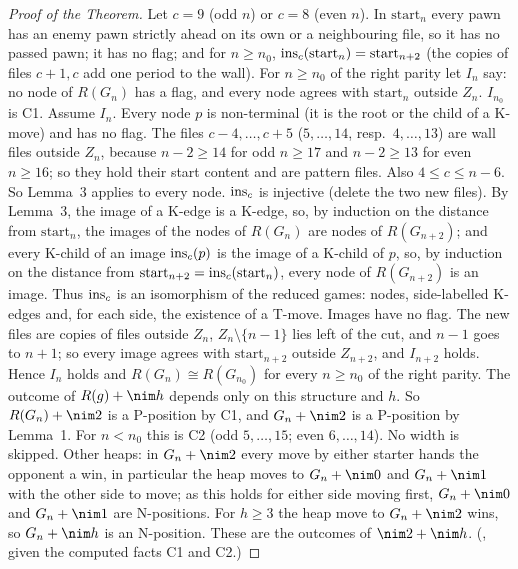 \begin{proof}[Proof of the Theorem]
Let $c=9$ (odd $n$) or $c=8$ (even $n$). In $\mathrm{start}_n$ every pawn has an enemy pawn strictly ahead on its own or a neighbouring
file, so it has no passed pawn; it has no flag; and for $n\ge n_0$, $\operatorname{ins}_c(\mathrm{start}_n)=\mathrm{start}_{n+2}$ (the copies of files
$c+1,c$ add one period to the wall). For $n\ge n_0$ of the right parity let $I_n$ say: no node of $R(G_n)$ has a flag, and every node agrees with
$\mathrm{start}_n$ outside $Z_n$. $I_{n_0}$ is C1.
Assume $I_n$. Every node $p$ is non-terminal (it is the root or the child of a K-move) and has no flag. The files $c-4,\dots,c+5$
($5,\dots,14$, resp.\ $4,\dots,13$) are wall files outside $Z_n$, because $n-2\ge14$ for odd $n\ge17$ and $n-2\ge13$ for even
$n\ge16$; so they hold their start content and are pattern files. Also $4\le c\le n-6$. So Lemma~3 applies to every node.
$\operatorname{ins}_c$ is injective (delete the two new files). By Lemma~3, the image of a K-edge is a K-edge, so, by induction on the distance from
$\mathrm{start}_n$, the images of the nodes of $R(G_n)$ are nodes of $R(G_{n+2})$; and every K-child of an image $\operatorname{ins}_c(p)$ is the image of a K-child of $p$, so, by induction on the distance
from $\mathrm{start}_{n+2}=\operatorname{ins}_c(\mathrm{start}_n)$, every node of $R(G_{n+2})$ is an image. Thus $\operatorname{ins}_c$ is an isomorphism of the
reduced games: nodes, side-labelled K-edges and, for each side, the existence of a T-move. Images have no flag. The new files are copies of files outside $Z_n$, $Z_n\setminus\{n-1\}$ lies left of the cut, and $n-1$ goes to
$n+1$; so every image agrees with $\mathrm{start}_{n+2}$ outside $Z_{n+2}$, and $I_{n+2}$ holds.
Hence $I_n$ holds and $R(G_n)\cong R(G_{n_0})$ for every $n\ge n_0$ of the right parity. The outcome of $R(g)+\nim h$ depends only on
this structure and $h$. So $R(G_n)+\nim2$ is a P-position by C1, and
$G_n+\nim2$ is a P-position by Lemma~1. For $n<n_0$ this is C2 (odd $5,\dots,15$; even $6,\dots,14$). No width is skipped.
Other heaps: in $G_n+\nim2$ every move by either starter hands the opponent a win, in particular the heap moves to $G_n+\nim0$ and $G_n+\nim1$ with the other side to
move; as this holds for either side moving first, $G_n+\nim0$ and $G_n+\nim1$ are N-positions. For $h\ge3$ the heap move to $G_n+\nim2$
wins, so $G_n+\nim h$ is an N-position. These are the outcomes of $\nim2+\nim h$.
(, given the computed facts C1 and C2.)
\end{proof}

